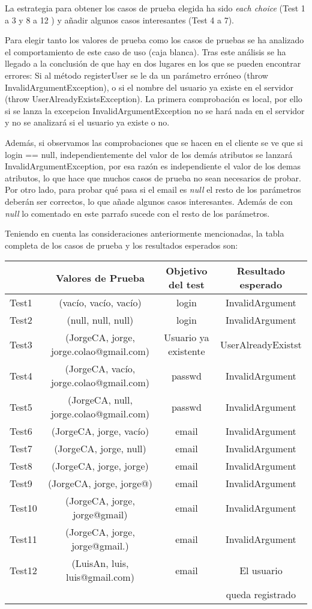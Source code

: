 La estrategia para obtener los casos de prueba elegida ha sido
\textit{each choice} (Test 1 a 3 y 8 a 12 ) y añadir algunos casos
interesantes (Test 4 a 7).

Para elegir tanto los valores de prueba como los casos de pruebas se ha analizado el comportamiento de este caso de uso (caja blanca). Tras este análisis se ha llegado a la conclusión de que hay en dos lugares en los que se pueden encontrar errores: Si al método registerUser se le da un parámetro erróneo (throw InvalidArgumentException), o si el nombre del usuario ya existe en el servidor (throw UserAlreadyExistsException). La primera comprobación es local, por ello si se lanza la excepcion InvalidArgumentException no se hará nada en el servidor y no se analizará si el usuario ya existe o no.

Además, si observamos las comprobaciones que se hacen en el cliente se ve que si login == null, independientemente del valor de los demás atributos se lanzará  InvalidArgumentException, por esa razón es independiente el valor de los demas atributos, lo que hace que muchos casos de prueba no sean necesarios de probar. Por otro lado, para probar qué pasa si el email es \textit{null} el resto de los parámetros deberán ser correctos, lo que añade algunos casos interesantes. Además de con \textit{null} lo comentado en este parrafo sucede con el resto de los parámetros.


Teniendo en cuenta las consideraciones anteriormente mencionadas, la tabla completa de los casos de prueba y los resultados esperados son:

{\footnotesize
\begin{longtable}[c]{lccc}
 & \textbf{Valores de Prueba} & \textbf{Objetivo del test} & \textbf{Resultado esperado} \\
\hline \hline
\endhead

Test1 & (vacío, vacío, vacío)  & login & InvalidArgument\\
Test2 & (null, null, null) & login & InvalidArgument\\
Test3 & (JorgeCA, jorge, jorge.colao@gmail.com) & Usuario ya existente & UserAlreadyExistst\\
Test4 & (JorgeCA, vacío, jorge.colao@gmail.com) & passwd   & InvalidArgument\\
Test5 & (JorgeCA, null, jorge.colao@gmail.com) & passwd   & InvalidArgument\\
Test6 & (JorgeCA, jorge, vacío) & email   & InvalidArgument\\
Test7 & (JorgeCA, jorge, null) & email   & InvalidArgument\\
Test8 & (JorgeCA, jorge, jorge) & email & InvalidArgument\\
Test9 & (JorgeCA, jorge, jorge@) & email & InvalidArgument\\
Test10 & (JorgeCA, jorge, jorge@gmail) & email & InvalidArgument\\
Test11& (JorgeCA, jorge, jorge@gmail.) & email  & InvalidArgument\\
Test12& (LuisAn, luis, luis@gmail.com) & email  &  El usuario \\
& &  & queda registrado\\
\hline
\end{longtable}
}

